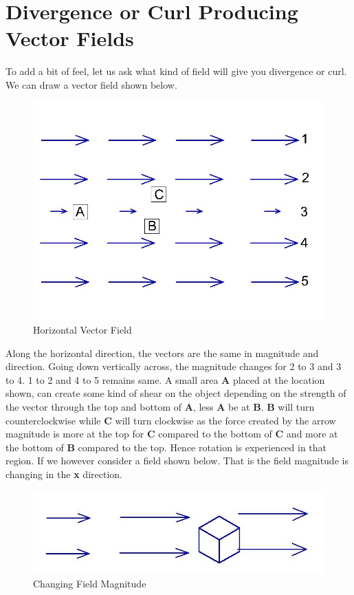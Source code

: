 \section{Divergence or Curl Producing Vector Fields}
To add a bit of feel, let us ask what kind of field will give you divergence or curl. We can draw a vector field shown below.
\begin{figure}[h]
\centering
\includegraphics[width=1\linewidth]{./graphics/fig171}
\caption{Horizontal Vector Field}
\end{figure}

Along the horizontal direction, the vectors are the same in magnitude and direction. Going down vertically across, the magnitude changes for 2 to 3 and 3 to 4. 1 to 2 and 4 to 5 remains same. A small area \textbf{A} placed at the location shown, can create some kind of shear on the object depending on the strength of the vector through the top and bottom of \textbf{A}, less \textbf{A} be at \textbf{B}. \textbf{B} will turn counterclockwise while \textbf{C} will turn clockwise as the force created by the arrow magnitude is more at the top for \textbf{C} compared to the bottom of \textbf{C} and more at the bottom of \textbf{B} compared to the top. Hence rotation is experienced in that region. If we however consider a field shown below. That is the field magnitude is changing in the \textbf{x} direction.
\begin{figure}[h]
\centering
\includegraphics[width=1\linewidth]{./graphics/fig172}
\caption{Changing Field Magnitude}
\end{figure}

